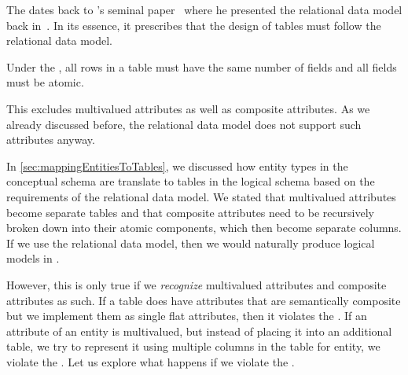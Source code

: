 %
\label{sec:normalForm:1}%
%
The  dates back to \citeauthor{C1970ARMODFLSDB}'s seminal paper~\cite{C1970ARMODFLSDB} where he presented the relational data model back in~\citeyear{C1970ARMODFLSDB}.
In its essence, it prescribes that the design of tables must follow the relational data model.%
%
\begin{definition}%
Under the , all rows in a table must have the same number of fields and all fields must be atomic.%
\end{definition}%
%
This excludes multivalued attributes as well as composite attributes.
As we already discussed before, the relational data model does not support such attributes anyway.

In \cref{sec:mappingEntitiesToTables}, we discussed how entity types in the conceptual schema are translate to tables in the logical schema based on the requirements of the relational data model.
We stated that multivalued attributes become separate tables and that composite attributes need to be recursively broken down into their atomic components, which then become separate columns.
If we use the relational data model, then we would naturally produce logical models in .

However, this is only true if we \emph{recognize} multivalued attributes and composite attributes as such.
If a table does have attributes that are semantically composite but we implement them as single flat attributes, then it violates the .
If an attribute of an entity is multivalued, but instead of placing it into an additional table, we try to represent it using multiple columns in the table for entity, we violate the .
Let us explore what happens if we violate the .%
%
\FloatBarrier%
%
%
\FloatBarrier%
\endhsection%
%
